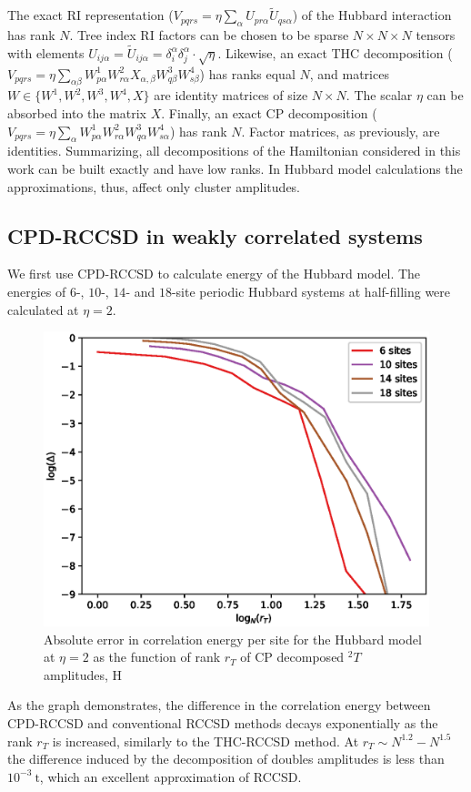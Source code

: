 The exact RI representation ($V_{pqrs} = 
\eta \sum_{\alpha} U_{pr\alpha} \tilde{U}_{qs\alpha}$) of the Hubbard 
interaction has rank $N$. Tree index RI factors can be chosen to be sparse $N 
\times N \times N$ tensors with elements $U_{ij\alpha} = \tilde{U}_{ij\alpha} 
= \delta_{i}^{\alpha} \delta_{j}^{\alpha} \cdot \sqrt{\eta}$. Likewise, an 
exact THC decomposition ($V_{pqrs} = \eta \sum_{\alpha \beta} W^{1}_{p\alpha} 
W^{2}_{r\alpha} X_{\alpha, \beta} W^{3}_{q\beta} W^{4}_{s\beta}$) has ranks 
equal $N$, and matrices $W \in \{W^{1}, W^{2}, W^{3}, W^{4}, X\}$ are identity 
matrices of size $N \times N$. The scalar $\eta$ can be absorbed into the 
matrix $X$. Finally, an exact CP decomposition ($V_{pqrs} = \eta \sum_{\alpha} 
W^{1}_{p\alpha} W^{2}_{r\alpha} W^{3}_{q\alpha} W^{4}_{s\alpha}$) has rank $N$.
Factor matrices, as previously, are identities. Summarizing, all decompositions 
of the Hamiltonian considered in this work can be built exactly and have low 
ranks. In Hubbard model calculations the approximations, thus, affect only 
cluster amplitudes.

\subsection{CPD-RCCSD in weakly correlated systems}
We first use CPD-RCCSD to calculate energy of the Hubbard model.
The energies of $6$-, $10$-, $14$- and $18$-site periodic Hubbard systems at 
half-filling were calculated at $\eta = 2$.
%
\begin{figure}[!tb]
\includegraphics[width=\columnwidth]{figures/cpd_rccsd/err_vs_r_u_2_cpd}
\caption{Absolute error in correlation energy per site for the 
Hubbard model at $\eta = 2$ as the function of rank $r_{T}$ of CP decomposed
${}^2T$ amplitudes, H
\label{fig:err_vs_r_u_2}}
\end{figure}
%
As the graph demonstrates, the difference in the correlation energy 
between CPD-RCCSD and conventional RCCSD methods decays exponentially as the 
rank $r_{T}$ is increased, similarly to the THC-RCCSD method. At  
$r_{T} \sim N^{1.2} - N^{1.5}$ the difference induced by the decomposition 
of doubles amplitudes is less than $10^{-3}~\mathrm{t}$, which an excellent 
approximation of RCCSD. 

